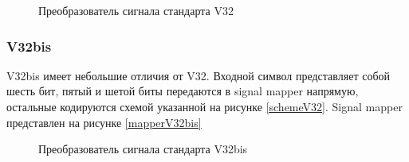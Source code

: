 \documentclass[a4paper,12pt]{article}
\begin{document}
\begin{figure}
	\caption{Преобразователь сигнала стандарта V32}
	\label{mapperV32}
\end{figure}

\subsubsection{V32bis}
V32bis имеет небольшие отличия от V32. Входной символ представляет собой шесть бит, пятый и шетой биты передаются в 
signal mapper напрямую, остальные кодируются схемой указанной на рисунке \ref{schemeV32}. Signal mapper представлен
на рисунке \ref{mapperV32bis}

\begin{figure}
	\caption{Преобразователь сигнала стандарта V32bis}
	\label{mapperV32}
\end{figure}
\end{document}
